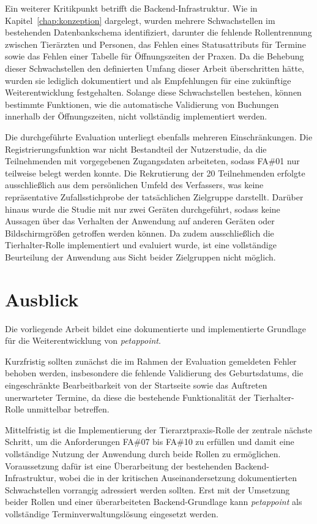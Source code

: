 Ein weiterer Kritikpunkt betrifft die Backend-Infrastruktur. Wie in Kapitel~\ref{chap:konzeption} dargelegt, wurden mehrere Schwachstellen im bestehenden Datenbankschema identifiziert, darunter die fehlende Rollentrennung zwischen Tierärzten und Personen, das Fehlen eines Statusattributs für Termine sowie das Fehlen einer Tabelle für Öffnungszeiten der Praxen. Da die Behebung dieser Schwachstellen den definierten Umfang dieser Arbeit überschritten hätte, wurden sie lediglich dokumentiert und als Empfehlungen für eine zukünftige Weiterentwicklung festgehalten. Solange diese Schwachstellen bestehen, können bestimmte Funktionen, wie die automatische Validierung von Buchungen innerhalb der Öffnungszeiten, nicht vollständig implementiert werden.

Die durchgeführte Evaluation unterliegt ebenfalls mehreren Einschränkungen. Die Registrierungsfunktion war nicht Bestandteil der Nutzerstudie, da die Teilnehmenden mit vorgegebenen Zugangsdaten arbeiteten, sodass FA\#01 nur teilweise belegt werden konnte. Die Rekrutierung der 20 Teilnehmenden erfolgte ausschließlich aus dem persönlichen Umfeld des Verfassers, was keine repräsentative Zufallsstichprobe der tatsächlichen Zielgruppe darstellt. Darüber hinaus wurde die Studie mit nur zwei Geräten durchgeführt, sodass keine Aussagen über das Verhalten der Anwendung auf anderen Geräten oder Bildschirmgrößen getroffen werden können. Da zudem ausschließlich die Tierhalter-Rolle implementiert und evaluiert wurde, ist eine vollständige Beurteilung der Anwendung aus Sicht beider Zielgruppen nicht möglich.

\section{Ausblick}
Die vorliegende Arbeit bildet eine dokumentierte und implementierte
Grundlage für die Weiterentwicklung von \textit{petappoint}.

Kurzfristig sollten zunächst die im Rahmen der Evaluation gemeldeten
Fehler behoben werden, insbesondere die fehlende Validierung des
Geburtsdatums, die eingeschränkte Bearbeitbarkeit von der Startseite
sowie das Auftreten unerwarteter Termine, da diese die bestehende
Funktionalität der Tierhalter-Rolle unmittelbar betreffen.

Mittelfristig ist die Implementierung der Tierarztpraxis-Rolle der
zentrale nächste Schritt, um die Anforderungen FA\#07 bis FA\#10 zu
erfüllen und damit eine vollständige Nutzung der Anwendung durch
beide Rollen zu ermöglichen. Voraussetzung dafür ist eine
Überarbeitung der bestehenden Backend-Infrastruktur, wobei die in
der kritischen Auseinandersetzung dokumentierten Schwachstellen
vorrangig adressiert werden sollten. Erst mit der Umsetzung beider
Rollen und einer überarbeiteten Backend-Grundlage kann
\textit{petappoint} als vollständige Terminverwaltungslösung
eingesetzt werden.

